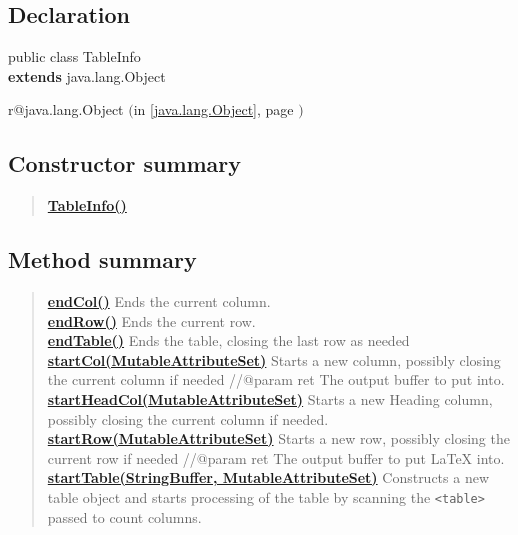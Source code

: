 \documentclass[11pt,a4paper]{report}
\makeatletter
\newcommand{\refdefined}[1]{
\expandafter\ifx\csname r@#1\endcsname\relax
\relax\else
{$($in \ref{#1}, page \pageref{#1}$)$}\fi}
\makeatother
\begin{document}
{{{\subsection{Declaration}{
\small public class TableInfo
\\ {\bf  extends} java.lang.Object
\refdefined{java.lang.Object}}
\subsection{Constructor summary}{
\begin{verse}
\hyperlink{org.stfm.texdoclet.TableInfo()}{{\bf TableInfo()}} \\
\end{verse}
}
\subsection{Method summary}{
\begin{verse}
\hyperlink{org.stfm.texdoclet.TableInfo.endCol()}{{\bf endCol()}} Ends the current column.\\
\hyperlink{org.stfm.texdoclet.TableInfo.endRow()}{{\bf endRow()}} Ends the current row.\\
\hyperlink{org.stfm.texdoclet.TableInfo.endTable()}{{\bf endTable()}} Ends the table, closing the last row as needed\\
\hyperlink{org.stfm.texdoclet.TableInfo.startCol(javax.swing.text.MutableAttributeSet)}{{\bf startCol(MutableAttributeSet)}} Starts a new column, possibly closing the current column if needed //@param ret The output buffer to put \LaTeXe{} into.\\
\hyperlink{org.stfm.texdoclet.TableInfo.startHeadCol(javax.swing.text.MutableAttributeSet)}{{\bf startHeadCol(MutableAttributeSet)}} Starts a new Heading column, possibly closing the current column if needed.\\
\hyperlink{org.stfm.texdoclet.TableInfo.startRow(javax.swing.text.MutableAttributeSet)}{{\bf startRow(MutableAttributeSet)}} Starts a new row, possibly closing the current row if needed //@param ret The output buffer to put \LaTeX{} into.\\
\hyperlink{org.stfm.texdoclet.TableInfo.startTable(java.lang.StringBuffer, javax.swing.text.MutableAttributeSet)}{{\bf startTable(StringBuffer, MutableAttributeSet)}} Constructs a new table object and starts processing of the table by scanning the \texttt{\small \textless table\textgreater } passed to count columns.\\
\end{verse}
}
}}}
\end{document}
